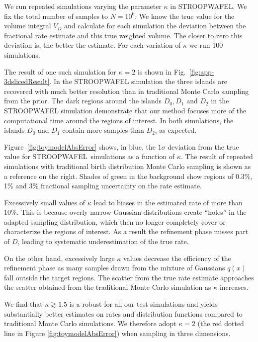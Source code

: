 \documentclass[a4paper,fleqn,usenatbib,useAMS,usedcolumn]{mnras}
\newcommand{\AISs}{\textsc{STROOPWAFEL}}
\begin{document}
We run repeated simulations varying the parameter $\kappa$ in  \AISs.  We fix the total number of samples  to $N = 10^6$.  We know the true value for the volume integral $V_D$ and calculate for each simulation the deviation between the fractional rate estimate and this true weighted volume. The closer to zero this deviation is, the better the estimate. For each variation of $\kappa$ we run 100 simulations.  
 
 
The result of one such simulation for $\kappa = 2$ is shown in Fig.~\ref{fig:app-3dslicedResult}. In the \AISs{} simulation the three islands are recovered with much better resolution than in traditional Monte Carlo sampling from the prior. The dark regions around the islands $D_0, D_1 $ and $D_2$ in the \AISs{} simulation demonstrate that our method focuses more of the computational time around the regions of interest.  
In both simulations, the islands {$D_0$} and  {$D_1$} contain more samples than {$D_2$}, as expected. 


Figure~\ref{fig:toymodelAbsError} shows, in blue, the $1 \sigma$ deviation from the true value for \AISs \ simulations as a function of $\kappa$. The result of repeated simulations with traditional birth distribution Monte Carlo sampling is shown as a reference on the right.  Shades of green in the background show regions of 0.3$\%$, 1$\%$ and $3\%$ fractional sampling uncertainty on the rate estimate. 

Excessively small values of $\kappa$ lead to biases in the estimated rate of more than $10\%$. This is because overly narrow Gaussian distributions create ``holes'' in the adapted sampling distribution, which then no longer completely cover or characterize the regions of interest. As a result the refinement phase misses part of $D$, leading to systematic underestimation of the true rate. 

On the other hand, excessively large $\kappa$ values decrease the efficiency of the refinement phase as many samples drawn from the mixture of Gaussians $q(x)$ fall outside the target regions. The scatter from the true rate estimate approaches the scatter obtained from the traditional Monte Carlo simulation as $\kappa$ increases. 

We find that $\kappa \gtrsim 1.5$ is a robust for all our test simulations and yields substantially better estimates on rates and distribution functions compared to traditional Monte Carlo simulations. We therefore adopt $\kappa = 2$ (the red dotted line in Figure \ref{fig:toymodelAbsError}) when sampling in three dimensions.
\end{document}
